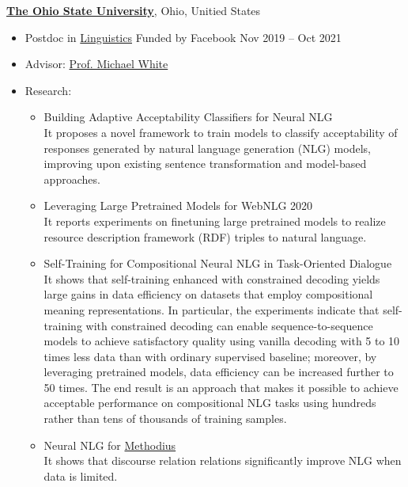 \vspace{16pt}
{\bf \href{https://www.osu.edu/}{The Ohio State University}}, Ohio, Unitied States
\begin{itemize}
    \item[] Postdoc in \href{https://linguistics.osu.edu/}{Linguistics} Funded by Facebook \hfill Nov 2019 -- Oct 2021
    \item[] Advisor: \href{https://u.osu.edu/white.1240/}{Prof. Michael White}
    \item[] Research:
    \begin{itemize}
        \item Building Adaptive Acceptability Classifiers for Neural NLG~\cite{batra-etal-2021-building} \\
        It proposes a novel framework to train models to classify acceptability of responses generated by natural language generation (NLG) models, improving upon existing sentence transformation and model-based approaches.
        \item Leveraging Large Pretrained Models for {W}eb{NLG} 2020~\cite{li-etal-2020-leveraging-large} \\
        It reports experiments on finetuning large pretrained models to realize resource description framework (RDF) triples to natural language.
        \item Self-Training for Compositional Neural NLG in Task-Oriented Dialogue~\cite{li-white-wecnlp-2020, li-etal-2021-self} \\
        It shows that self-training enhanced with constrained decoding yields large gains in data efficiency on datasets that employ compositional meaning representations.
        In particular, the experiments indicate that self-training with constrained decoding can enable sequence-to-sequence models to achieve satisfactory quality using vanilla decoding with 5 to 10 times less data than with ordinary supervised baseline; moreover, by leveraging pretrained models, data efficiency can be increased further to 50 times.
        The end result is an approach that makes it possible to achieve acceptable performance on compositional NLG tasks using hundreds rather than tens of thousands of training samples.
        \item Neural NLG for \href{https://aclanthology.org/L16-1273/}{Methodius}~\cite{stevens-guille-etal-2020-neural, maskharashvili-etal-2021-neural} \\
        It shows that discourse relation relations significantly improve NLG when data is limited.
    \end{itemize}
\end{itemize}

